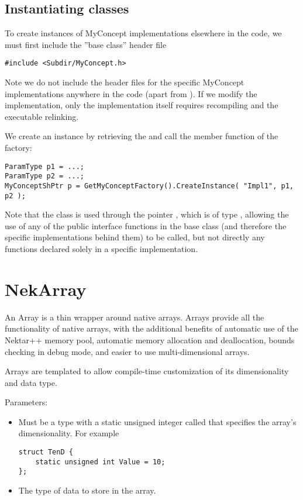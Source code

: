 \subsection{Instantiating classes}
To create instances of MyConcept implementations elsewhere in the code, we must
first include the ''base class'' header file
\begin{lstlisting}[style=C++Style]
#include <Subdir/MyConcept.h>
\end{lstlisting}
Note we do not include the header files for the specific MyConcept 
implementations anywhere in the code (apart from ).
If we modify the implementation, only the implementation itself requires 
recompiling and the executable relinking.

We create an instance by retrieving the  and call the
 member function of the factory:
\begin{lstlisting}[style=C++Style]
ParamType p1 = ...;
ParamType p2 = ...;
MyConceptShPtr p = GetMyConceptFactory().CreateInstance( "Impl1", p1, p2 );
\end{lstlisting}

Note that the class is used through the pointer , which is of type
, allowing the use of any of the public interface
functions in the base class (and therefore the specific implementations behind them) to be
called, but not directly any functions declared solely in a specific
implementation.


\section{NekArray}
An Array is a thin wrapper around native arrays. Arrays provide all the
functionality of native arrays, with the additional benefits of automatic use of
the Nektar++ memory pool, automatic memory allocation and deallocation, bounds
checking in debug mode, and easier to use multi-dimensional arrays.

Arrays are templated to allow compile-time customization of its dimensionality
and data type.

Parameters:
\begin{itemize}
\item {} Must be a type with a static unsigned integer called
 that specifies the array's dimensionality. For example
\begin{lstlisting}[style=C++Style]
struct TenD {
    static unsigned int Value = 10;
};
\end{lstlisting}
\item {} The type of data to store in the array.
\end{itemize}

